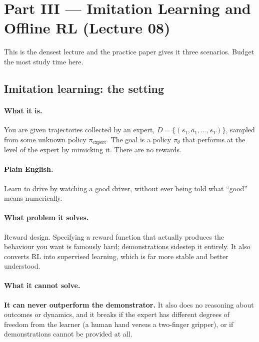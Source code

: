 \documentclass[11pt,a4paper]{article}
\begin{document}
\newpage
\section{Part III --- Imitation Learning and Offline RL (Lecture 08)}

This is the densest lecture and the practice paper gives it three scenarios.
Budget the most study time here.

\subsection{Imitation learning: the setting}

\paragraph{What it is.} You are given trajectories collected by an expert,
$D=\{(s_1,a_1,\dots,s_T)\}$, sampled from some unknown policy
$\pi_{\text{expert}}$. The goal is a policy $\pi_\theta$ that performs at the
level of the expert by mimicking it. There are no rewards.

\paragraph{Plain English.} Learn to drive by watching a good driver, without
ever being told what ``good'' means numerically.

\paragraph{What problem it solves.} Reward design. Specifying a reward
function that actually produces the behaviour you want is famously hard;
demonstrations sidestep it entirely. It also converts RL into supervised
learning, which is far more stable and better understood.

\paragraph{What it cannot solve.} \textbf{It can never outperform the
demonstrator.} It also does no reasoning about outcomes or dynamics, and it
breaks if the expert has different degrees of freedom from the learner (a
human hand versus a two-finger gripper), or if demonstrations cannot be
provided at all.
\end{document}

